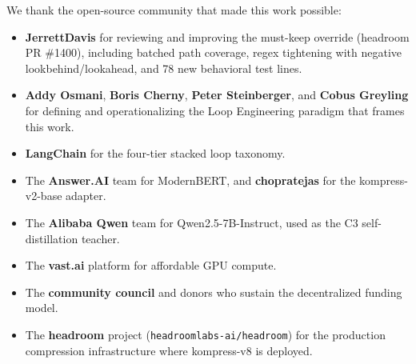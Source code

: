 We thank the open-source community that made this work possible:
\begin{itemize}
  \item \textbf{JerrettDavis} for reviewing and improving the must-keep
        override (headroom PR \#1400), including batched path coverage,
        regex tightening with negative lookbehind/lookahead, and 78 new
        behavioral test lines.
  \item \textbf{Addy Osmani}, \textbf{Boris Cherny}, \textbf{Peter
        Steinberger}, and \textbf{Cobus Greyling} for defining and
        operationalizing the Loop Engineering paradigm that frames this work.
  \item \textbf{LangChain} for the four-tier stacked loop taxonomy.
  \item The \textbf{Answer.AI} team for ModernBERT, and
        \textbf{chopratejas} for the kompress-v2-base adapter.
  \item The \textbf{Alibaba Qwen} team for Qwen2.5-7B-Instruct, used as the
        C3 self-distillation teacher.
  \item The \textbf{vast.ai} platform for affordable GPU compute.
  \item The \textbf{community council} and donors who sustain the
        decentralized funding model.
  \item The \textbf{headroom} project (\texttt{headroomlabs-ai/headroom})
        for the production compression infrastructure where kompress-v8 is
        deployed.
\end{itemize}
